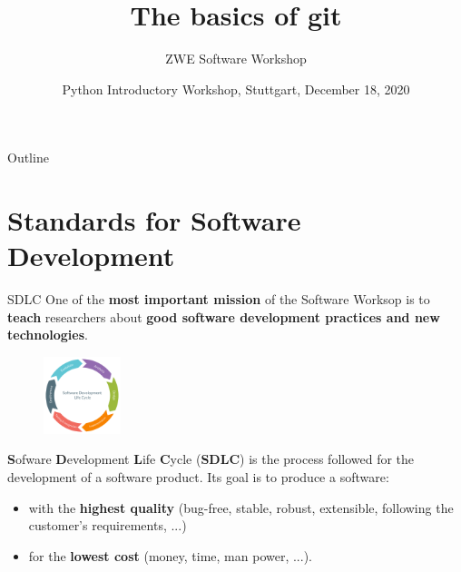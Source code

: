 \documentclass[compress,english,aspectratio=1610]{beamer}
\title{The basics of git}
\author{ZWE Software Workshop}
\institute{Max-Planck-Institut f\"ur Intelligente Systeme}
\date{\small{Python Introductory Workshop, Stuttgart, December 18, 2020}}
\let\olditem\item
\renewcommand{\item}{\setlength{\itemsep}{\fill}\olditem}
\begin{document}
\begin{frame}[plain,label=thetitle]
 \titlepage
\end{frame}



\begin{frame}{Outline}
	\tableofcontents
\end{frame}

\section{Standards for Software Development}

\begin{frame}{SDLC}
    One of the  \textbf{most important mission} of the Software Worksop is to
    \textbf{teach} researchers about \textbf{good software development practices and new technologies}.

	\begin{figure}
        \includegraphics[width=0.2\textwidth]{figures/cycle.png}
    \end{figure}

    \textbf{S}ofware \textbf{D}evelopment \textbf{L}ife \textbf{C}ycle (\textbf{SDLC}) is the process followed for the development
    of a software product. Its goal is to produce a software:
    \begin{itemize}
        \item with the \textbf{highest quality} (bug-free, stable, robust,
        extensible, following the customer's requirements, ...)
        \item for the \textbf{lowest cost} (money, time, man power, ...).
    \end{itemize}
\end{frame}


\end{document}
